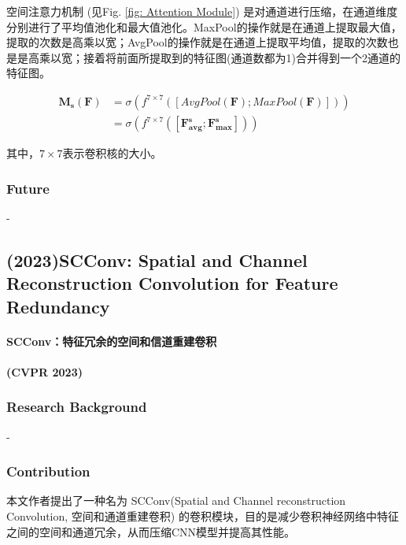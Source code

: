 \documentclass[a4paper]{ctexart}
\begin{document}
	空间注意力机制 (见Fig. \ref{fig: Attention Module}) 是对通道进行压缩，在通道维度分别进行了平均值池化和最大值池化。MaxPool的操作就是在通道上提取最大值，提取的次数是高乘以宽；AvgPool的操作就是在通道上提取平均值，提取的次数也是是高乘以宽；接着将前面所提取到的特征图(通道数都为1)合并得到一个2通道的特征图。
	
	\begin{equation}
		\begin{aligned}
			\mathbf{M_s}(\mathbf{F}) &= \sigma \left( f^{7 \times 7}([AvgPool(\mathbf{F});MaxPool(\mathbf{F})]) \right) \\
			&= \sigma \left( f^{7 \times 7}([\mathbf{F^s_{avg}};\mathbf{F^s_{max}}]) \right)
		\end{aligned}
		\label{eq: Spatial Attention Module}
	\end{equation}
	
	其中，$7 \times 7$表示卷积核的大小。
	
	\subsubsection{Future}
	
	-
	
	\subsection{(2023)SCConv: Spatial and Channel Reconstruction Convolution for Feature Redundancy}
	
	\paragraph{SCConv：特征冗余的空间和信道重建卷积 }
	
	\paragraph{(CVPR 2023)}
	
	\subsubsection{Research Background}
	
	-
	
	\subsubsection{Contribution}
	
	本文作者提出了一种名为 SCConv(Spatial and Channel reconstruction Convolution, 空间和通道重建卷积) 的卷积模块，目的是减少卷积神经网络中特征之间的空间和通道冗余，从而压缩CNN模型并提高其性能。
	
\end{document}
